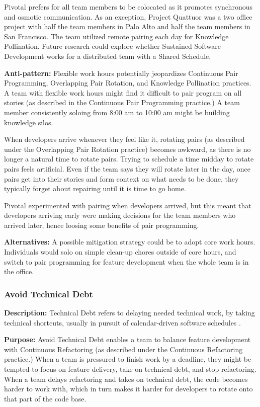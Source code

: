 \begin{table}[]
Pivotal prefers for all team members to be colocated as it promotes synchronous and osmotic communication. As an exception, Project Quattuor was a two office project with half the team members in Palo Alto and half the team members in San Francisco. The team utilized remote pairing each day for Knowledge Pollination. Future research could explore whether Sustained Software Development works for a distributed team with a Shared Schedule.

\textbf{Anti-pattern:} Flexible work hours potentially jeopardizes Continuous Pair Programming, Overlapping Pair Rotation, and Knowledge Pollination practices. A team with flexible work hours might find it difficult to pair program on all stories (as described in the Continuous Pair Programming practice.) A team member consistently soloing from 8:00 am to 10:00 am might be building knowledge silos. 

When developers arrive whenever they feel like it, rotating pairs (as described under the Overlapping Pair Rotation practice) becomes awkward, as there is no longer a natural time to rotate pairs. Trying to schedule a time midday to rotate pairs feels artificial. Even if the team says they will rotate later in the day, once pairs get into their stories and form context on what needs to be done, they typically forget about repairing until it is time to go home.

Pivotal experimented with pairing when developers arrived, but this meant that developers arriving early were making decisions for the team members who arrived later, hence loosing some benefits of pair programming. 

\textbf{Alternatives:} A possible mitigation strategy could be to adopt core work hours. Individuals would solo on simple clean-up chores outside of core hours, and switch to pair programming for feature development when the whole team is in the office.  

\subsubsection{Avoid Technical Debt}
\textbf{Description:} Technical Debt refers to delaying needed technical work, by taking technical shortcuts, usually in pursuit of calendar-driven software schedules \cite{McConnellTechnicalDebt}.  

\textbf{Purpose:} Avoid Technical Debt enables a team to balance feature development with Continuous Refactoring  (as described under the Continuous Refactoring practice.) When a team is pressured to finish work by a deadline, they might be tempted to focus on feature delivery, take on technical debt, and stop refactoring. When a team delays refactoring and takes on technical debt, the code becomes harder to work with, which in turn makes it harder for developers to rotate onto that part of the code base. 


\end{table}
